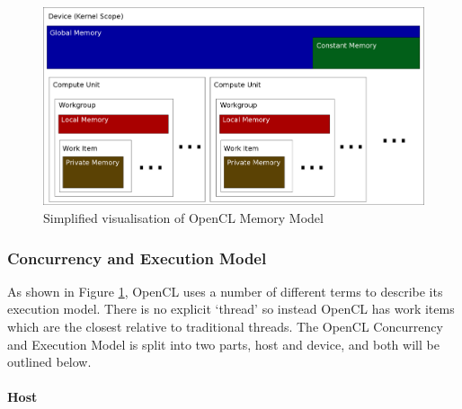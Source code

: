 \begin{figure}
\includegraphics[width=\linewidth]{images/openCLMemoryModel.png}
\caption{Simplified visualisation of OpenCL Memory Model}
\label{fig:openCLMemoryModel}
\end{figure}

\subsubsection{Concurrency and Execution Model}

As shown in Figure \ref{fig:openCLMemoryModel}, OpenCL uses a number of
different terms to describe its execution model. There is no explicit `thread'
so instead OpenCL has work items which are the closest relative to traditional
threads. The OpenCL Concurrency and Execution Model is split into two parts,
host and device, and both will be outlined below.

\paragraph{Host}

